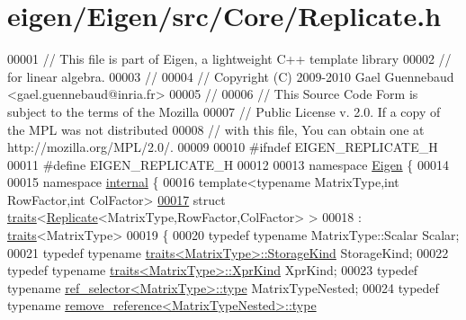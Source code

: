 \hypertarget{eigen_2_eigen_2src_2_core_2_replicate_8h_source}{}\section{eigen/\+Eigen/src/\+Core/\+Replicate.h}
\label{eigen_2_eigen_2src_2_core_2_replicate_8h_source}

\begin{DoxyCode}
00001 \textcolor{comment}{// This file is part of Eigen, a lightweight C++ template library}
00002 \textcolor{comment}{// for linear algebra.}
00003 \textcolor{comment}{//}
00004 \textcolor{comment}{// Copyright (C) 2009-2010 Gael Guennebaud <gael.guennebaud@inria.fr>}
00005 \textcolor{comment}{//}
00006 \textcolor{comment}{// This Source Code Form is subject to the terms of the Mozilla}
00007 \textcolor{comment}{// Public License v. 2.0. If a copy of the MPL was not distributed}
00008 \textcolor{comment}{// with this file, You can obtain one at http://mozilla.org/MPL/2.0/.}
00009 
00010 \textcolor{preprocessor}{#ifndef EIGEN\_REPLICATE\_H}
00011 \textcolor{preprocessor}{#define EIGEN\_REPLICATE\_H}
00012 
00013 \textcolor{keyword}{namespace }\hyperlink{namespace_eigen}{Eigen} \{ 
00014 
00015 \textcolor{keyword}{namespace }\hyperlink{namespaceinternal}{internal} \{
00016 \textcolor{keyword}{template}<\textcolor{keyword}{typename} MatrixType,\textcolor{keywordtype}{int} RowFactor,\textcolor{keywordtype}{int} ColFactor>
\hyperlink{struct_eigen_1_1internal_1_1traits_3_01_replicate_3_01_matrix_type_00_01_row_factor_00_01_col_factor_01_4_01_4}{00017} \textcolor{keyword}{struct }\hyperlink{struct_eigen_1_1internal_1_1traits}{traits}<\hyperlink{group___core___module_class_eigen_1_1_replicate}{Replicate}<MatrixType,RowFactor,ColFactor> >
00018  : \hyperlink{struct_eigen_1_1internal_1_1traits}{traits}<MatrixType>
00019 \{
00020   \textcolor{keyword}{typedef} \textcolor{keyword}{typename} MatrixType::Scalar Scalar;
00021   \textcolor{keyword}{typedef} \textcolor{keyword}{typename} \hyperlink{struct_eigen_1_1internal_1_1traits}{traits<MatrixType>::StorageKind} StorageKind;
00022   \textcolor{keyword}{typedef} \textcolor{keyword}{typename} \hyperlink{struct_eigen_1_1internal_1_1traits}{traits<MatrixType>::XprKind} XprKind;
00023   \textcolor{keyword}{typedef} \textcolor{keyword}{typename} \hyperlink{struct_eigen_1_1internal_1_1ref__selector}{ref\_selector<MatrixType>::type} MatrixTypeNested;
00024   \textcolor{keyword}{typedef} \textcolor{keyword}{typename} \hyperlink{group___sparse_core___module}{remove\_reference<MatrixTypeNested>::type} 

\end{DoxyCode}

